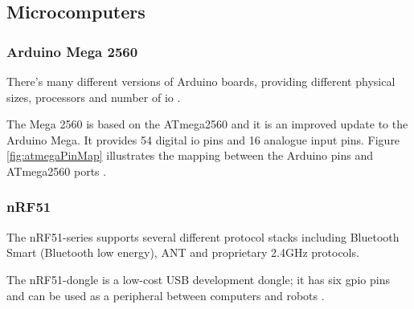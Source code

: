\subsection{Microcomputers}
\subsubsection{Arduino Mega 2560}
There's many different versions of Arduino boards, providing different physical sizes, processors and number of \acrfull{io} \cite{arduinoboards}. 

The Mega 2560 is based on the ATmega2560 and it is an improved update to the Arduino Mega. It provides 54 digital \acrshort{io} pins and 16 analogue input pins. Figure \ref{fig:atmegaPinMap} illustrates the mapping between the Arduino pins and ATmega2560 ports \cite{arduinomega2560}. 


\subsubsection{nRF51}
The nRF51-series supports several different protocol stacks including Bluetooth Smart (Bluetooth low energy), ANT and proprietary 2.4GHz protocols. 

The nRF51-dongle is a low-cost USB development dongle; it has six \acrfull{gpio} pins and can be used as a peripheral between computers and robots \cite{nrf51Dongle}.


